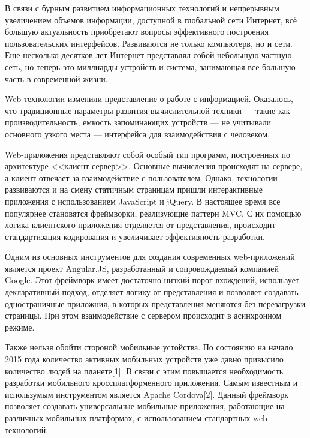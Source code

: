 В связи с бурным развитием информационных технологий и непрерывным увеличением объемов информации, доступной в глобальной сети Интернет, всё большую актуальность приобретают вопросы эффективного построения пользовательских интерфейсов. Развиваются не только компьютерв, но и сети. Еще несколько десятков лет Интернет представлял собой небольшую частную сеть, но теперь это миллиарды устройств и система, занимающая все большую часть в современной жизни.

Web-технологии изменили представление о работе с информацией. Оказалось, что традиционные параметры развития вычислительной техники --- такие как производительность, емкость запоминающих устройств --- не учитывали основного узкого места --- интерфейса для взаимодействия с человеком.

Web-приложения представляют собой особый тип программ, построенных по архитектуре <<клиент-сервер>>. Основные вычисления происходят на сервере, а клиент отвечает за взаимодействие с пользователем. Однако, технологии развиваются и на смену статичным страницам пришли интерактивные приложения с использованием JavaScript и jQuery. В настоящее время все популярнее становятся фреймворки, реализующие паттерн MVC. С их помощью логика клиентского приложения отделяется от представления, происходит стандартизация кодирования и увеличивает эффективность разработки.

Одним из основных инструментов для создания современных web-приложений является проект Angular.JS, разработанный и сопровождаемый компанией Google. Этот фреймворк имеет достаточно низкий порог вхождений, использует декларативный подход, отделяет логику от представления и позволяет создавать одностраничные приложния, в которых представления меняются без перезагрузки страницы. При этом взаимодействие с сервером происходит в асинхронном режиме.

Также нельзя обойти стороной мобильные устойства. По состоянию на начало 2015 года количество активных мобильных устройств уже давно привысило количество людей на планете[1]. В связи с этим повышается необходимость разработки мобильного кроссплатформенного приложения. Самым известным и использумым инструментом является Apache Cordova[2]. Данный фреймворк позволяет создавать универсальные мобильные приложения, работающие на различных мобильных платформах, с использованием стандартных web-технологий.

